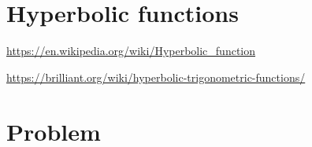 \documentclass[a4paper,oneside,12pt]{article}
\begin{document}

\section{Hyperbolic functions}

{\color{red}
\begin{packeditem}
\item \url{https://en.wikipedia.org/wiki/Hyperbolic_function}

\item \url{https://brilliant.org/wiki/hyperbolic-trigonometric-functions/}
\end{packeditem}
}


\newpage

\section*{Problem}
\end{document}
